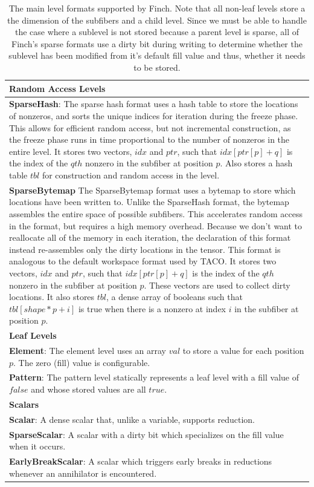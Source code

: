 \begin{table}[ht]
\begin{tabular}{p{14cm}}
    \hline
    \textbf{Random Access Levels} \\
    \hline
    \textbf{SparseHash}:
    The sparse hash format uses a hash table to store the locations of nonzeros, and sorts the unique indices for iteration during the freeze phase.
    This allows for efficient random access, but not incremental construction, as the freeze phase runs in time proportional to the number of nonzeros in the entire level.
    It stores two vectors, $idx$ and $ptr$, such that $idx[ptr[p] + q]$ is the index of the $qth$ nonzero in the subfiber at position $p$. 
    Also stores a hash table $tbl$ for construction and random access in the level. \\
    \textbf{SparseBytemap}
    The SparseBytemap format uses a bytemap to store which locations have been written to.
    Unlike the SparseHash format, the bytemap assembles the entire space of possible subfibers.
    This accelerates random access in the format, but requires a high memory overhead.
    Because we don't want to reallocate all of the memory in each iteration, the declaration of this format instead re-assembles only the dirty locations in the tensor.
    This format is analogous to the default workspace format used by TACO.
    It stores two vectors, $idx$ and $ptr$, such that $idx[ptr[p] + q]$ is the index of the $qth$ nonzero in the subfiber at position $p$.
    These vectors are used to collect dirty locations.
    It also stores $tbl$, a dense array of booleans such that $tbl[shape * p + i]$ is true when there is a nonzero at index $i$ in the subfiber at position $p$. \\
    \hline
    \textbf{Leaf Levels} \\
    \hline
    \textbf{Element}:
    The element level uses an array $val$ to store a value for each position $p$. The zero (fill) value is configurable.\\
    \textbf{Pattern}:
    The pattern level statically represents a leaf level with a fill value of $false$ and whose stored values are all $true$. \\
    \hline
    \textbf{Scalars} \\
    \hline
    \textbf{Scalar}:
    A dense scalar that, unlike a variable, supports reduction.  \\
    \textbf{SparseScalar}:
    A scalar with a dirty bit which specializes on the fill value when it occurs.\\
    \textbf{EarlyBreakScalar}:
    A scalar which triggers early breaks in reductions whenever an annihilator is encountered.\\
    \hline
    \end{tabular}
    \caption{The main level formats supported by Finch. Note that all non-leaf
    levels store a the dimension of the subfibers and a child level. Since we
    must be able to handle the case where a sublevel is not stored because a
    parent level is sparse, all of Finch's sparse formats use a dirty bit during
    writing to determine whether the sublevel has been modified from it's
    default fill value and thus, whether it needs to be stored.}
    \label{table:formats}
\end{table}
